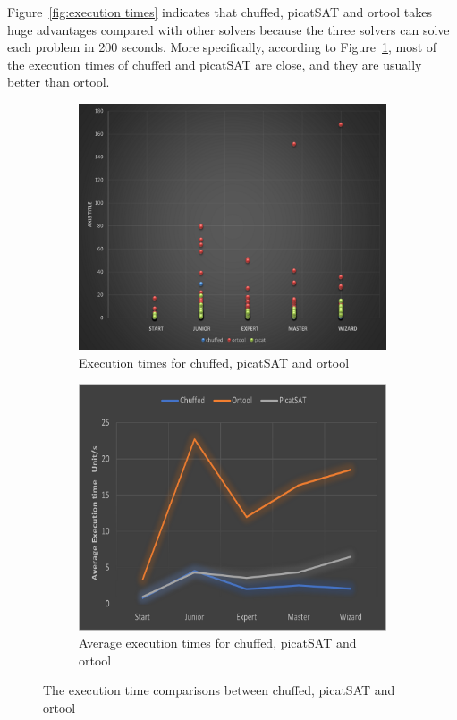 Figure~\ref{fig:execution times} indicates that chuffed, picatSAT and ortool takes huge advantages compared with other solvers because the three solvers can solve each problem in 200 seconds. More specifically, according to Figure~\ref{fig:3solvers1}, most of the execution times of chuffed and picatSAT are close, and they are usually better than ortool.
\begin{figure}[htbp]
\centering
\begin{subfigure}[b]{.48\textwidth}
\centering
\includegraphics[width=\textwidth]{figs/threesolverpoints.png}
\caption{Execution times for chuffed, picatSAT and ortool}
\label{fig:3solvers1}
\end{subfigure}
\begin{subfigure}[b]{.48\textwidth}
\centering
\includegraphics[width=\textwidth]{figs/Three comparison.png}
\caption{Average execution times for chuffed, picatSAT and ortool}
\label{fig:3comparison}
\end{subfigure}
\caption{The execution time comparisons between chuffed, picatSAT and ortool }
\label{fig:3comparisonsssss}
\end{figure}
